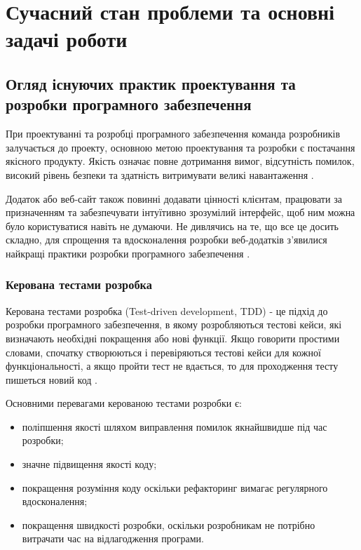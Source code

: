\section{Сучасний стан проблеми та основні задачі роботи}

\subsection{Огляд існуючих практик проектування та розробки програмного забезпечення}

При проектуванні та розробці програмного забезпечення команда
розробників залучається до проекту, основною метою проектування
та розробки є постачання якісного продукту.
Якість означає повне дотримання вимог, відсутність помилок,
високий рівень безпеки та здатність витримувати великі навантаження 
\cite{tdd-bdd-article}.

Додаток або веб-сайт також повинні додавати цінності клієнтам,
працювати за призначенням та забезпечувати інтуїтивно зрозумілий інтерфейс,
щоб ним можна було користуватися навіть не думаючи. Не дивлячись на те,
що все це досить складно, для спрощення та вдосконалення розробки веб-додатків з’явилися
найкращі практики розробки програмного забезпечення \cite{business-rybakov}.

\subsubsection{Керована тестами розробка}

Керована тестами розробка (Test-driven development, TDD) 
- це підхід до розробки програмного забезпечення,
в якому розробляються тестові кейси, які визначають необхідні покращення або нові функції.
Якщо говорити простими словами, спочатку створюються і перевіряються тестові кейси
для кожної функціональності, а якщо пройти тест не вдається,
то для проходження тесту пишеться новий код \cite{tdd-article}.

Основними перевагами керованою тестами розробки є:

\begin{itemize}
		\item поліпшення якості шляхом виправлення помилок якнайшвидше під час розробки;
		\item значне підвищення якості коду;
		\item покращення розуміння коду оскільки рефакторинг
			вимагає регулярного вдосконалення;
		\item покращення швидкості розробки, оскільки розробникам
			не потрібно витрачати час на відлагодження програми.
\end{itemize}

